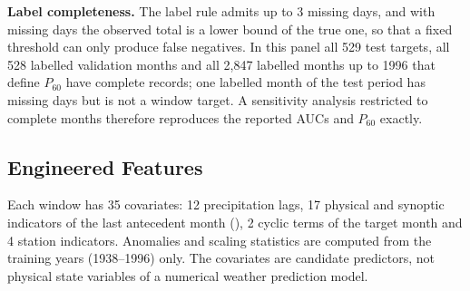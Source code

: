 \documentclass[11pt,a4paper]{article}
\begin{document}
\textbf{Label completeness.} The label rule admits up to 3 missing days, and with missing days the observed total is a lower bound of the true one, so that a fixed threshold can only produce false negatives. In this panel all 529 test targets, all 528 labelled validation months and all 2{,}847 labelled months up to 1996 that define $P_{60}$ have complete records; one labelled month of the test period has missing days but is not a window target. A sensitivity analysis restricted to complete months therefore reproduces the reported AUCs and $P_{60}$ exactly.

\subsection{Engineered Features}
\label{sec:glossary}

Each window has 35 covariates: 12 precipitation lags, 17 physical and synoptic indicators of the last antecedent month (), 2 cyclic terms of the target month and 4 station indicators. Anomalies and scaling statistics are computed from the training years (1938--1996) only. The covariates are candidate predictors, not physical state variables of a numerical weather prediction model.
\end{document}
